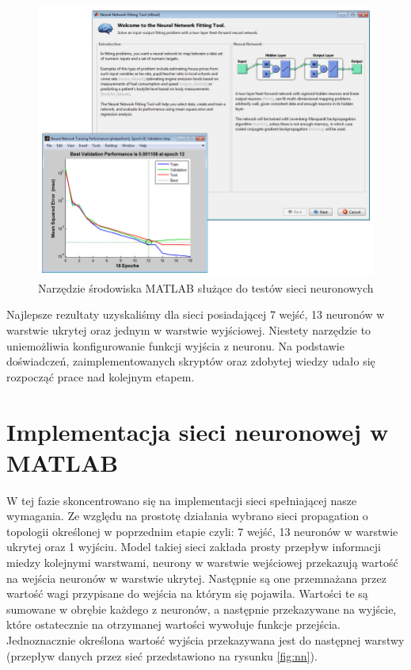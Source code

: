 \begin{figure}[tbph!]
	\centering
	\includegraphics[width=0.9\linewidth]{images/matlabnn.jpg}
	\caption{Narzędzie środowiska MATLAB służące do testów sieci neuronowych}
	\label{fig:nnmatlab}
\end{figure}

Najlepsze rezultaty uzyskaliśmy dla sieci posiadającej 7 wejść, 13 neuronów w warstwie ukrytej oraz jednym w warstwie wyjściowej. Niestety narzędzie to uniemożliwia konfigurowanie funkcji wyjścia z neuronu. Na podstawie doświadczeń, zaimplementowanych skryptów oraz zdobytej wiedzy udało się rozpocząć prace nad kolejnym etapem.

\section{Implementacja sieci neuronowej w MATLAB}
W tej fazie skoncentrowano się na implementacji sieci spełniającej nasze wymagania. Ze względu na prostotę działania wybrano sieci propagation o topologii określonej w poprzednim etapie czyli: 7 wejść, 13 neuronów w warstwie ukrytej oraz 1 wyjściu.
Model takiej sieci zakłada prosty przepływ informacji miedzy kolejnymi warstwami, neurony w warstwie wejściowej przekazują wartość na wejścia neuronów w warstwie ukrytej.
Następnie są one przemnażana przez wartość wagi przypisane do wejścia na którym się pojawiła. Wartości te są sumowane w obrębie każdego z neuronów, a następnie przekazywane na wyjście, które ostatecznie na otrzymanej wartości wywołuje funkcje przejścia. Jednoznacznie określona wartość wyjścia przekazywana jest do następnej warstwy (przepływ danych przez sieć przedstawiono na rysunku \ref{fig:nn}).

